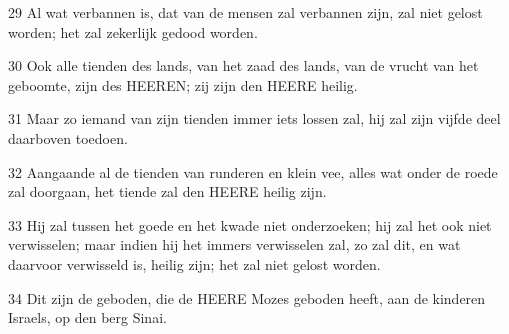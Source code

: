 \par 29 Al wat verbannen is, dat van de mensen zal verbannen zijn, zal niet gelost worden; het zal zekerlijk gedood worden.
\par 30 Ook alle tienden des lands, van het zaad des lands, van de vrucht van het geboomte, zijn des HEEREN; zij zijn den HEERE heilig.
\par 31 Maar zo iemand van zijn tienden immer iets lossen zal, hij zal zijn vijfde deel daarboven toedoen.
\par 32 Aangaande al de tienden van runderen en klein vee, alles wat onder de roede zal doorgaan, het tiende zal den HEERE heilig zijn.
\par 33 Hij zal tussen het goede en het kwade niet onderzoeken; hij zal het ook niet verwisselen; maar indien hij het immers verwisselen zal, zo zal dit, en wat daarvoor verwisseld is, heilig zijn; het zal niet gelost worden.
\par 34 Dit zijn de geboden, die de HEERE Mozes geboden heeft, aan de kinderen Israels, op den berg Sinai.



